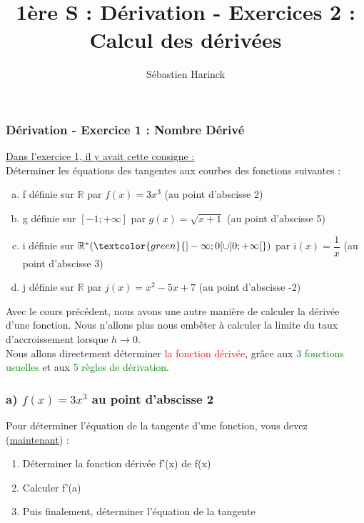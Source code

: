 \documentclass[t]{beamer}
\title{1ère S : Dérivation - Exercices 2 : Calcul des dérivées}
\author{Sébastien Harinck}
\institute{www.cours-futes.com}
\date{}
\begin{document}
\begin{frame}
\titlepage
\end{frame}

\begin{frame}[label=pagebanale]
\frametitle{Dérivation - Exercice 1 : Nombre Dérivé}
\pause
\underline{Dans l'exercice 1, il y avait cette consigne :} \\
\pause
Déterminer les équations des tangentes aux courbes des fonctions suivantes :
\pause
\begin{enumerate}[a)]
\item<+-> f définie sur $\mathbb{R}$ par $f(x) = 3x^3$ (au point d'abscisse 2)
\item<+-> g définie sur $[-1;+\infty ]$ par $g(x) = \sqrt{x+1}$ (au point d'abscisse 5)
\item<+-> i définie sur $\mathbb{R}^* (\textcolor{green}{]-\infty;0[\cup]0;+\infty[})$ par $i(x) = \dfrac{1}{x}$ (au point d'abscisse 3)
\item<+-> j définie sur $\mathbb{R}$ par $j(x) = x^2 - 5x +7$ (au point d'abscisse -2)
\end{enumerate}
\pause
Avec le cours précédent, \pause nous avons une autre manière de calculer la dérivée d'une fonction. \pause Nous n'allons plus nous embêter à calculer la limite du taux d'accroissement lorsque $h \rightarrow 0$. \\ 
\pause Nous allons directement déterminer \textcolor{red}{la fonction dérivée}, \pause grâce aux \textcolor{green}{3 fonctions usuelles} \pause et aux \textcolor{green}{5 règles de dérivation}. 
\end{frame}

\begin{frame}
\frametitle{a) $f(x) = 3x^3$ au point d'abscisse 2}
\pause
\begin{block}{}
Pour déterminer l'équation de la tangente d'une fonction, vous devez (\underline{maintenant}) :
\pause
\begin{enumerate}[1.]
\item Déterminer la fonction dérivée f'(x) de f(x)
\pause
\item Calculer f'(a)
\pause
\item Puis finalement, déterminer l'équation de la tangente
\end{enumerate}
\end{block}
\end{frame}
\end{document}
